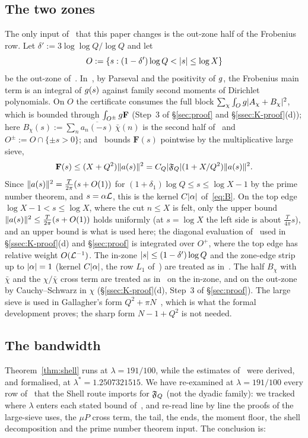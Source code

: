 \subsection{The two zones}\label{ssec:zones}
The only input of~\cite{DSouza} that this paper changes is the out-zone half of the Frobenius row. Let
$\delta':=3\log\log Q/\log Q$ and let
\[
O:=\{s:(1-\delta')\log Q<\lvert s\rvert\le\log X\}
\]
be the out-zone of~\cite[Lemma~4.3]{DSouza}. In~\cite[Lemmas~4.1--4.3]{DSouza}, by Parseval and the positivity of $g$, the
Frobenius main term is an integral of $g(s)$ against family second moments of Dirichlet polynomials. On $O$ the certificate consumes the full block $\sum_\chi\int_Og\lvert A_\chi+B_\chi\rvert^2$, which is bounded through $\int_{O^\pm}g\mathbf F$
(Step~3 of \S\ref{sec:proof} and \S\ref{ssec:K-proof}(d)); here $B_\chi(s):=\sum_n\overline{a_n(-s)}\,\bar\chi(n)$ is the second half of~\cite[Lemma~4.3]{DSouza} and
$O^\pm:=O\cap\{\pm s>0\}$; and~\cite{DSouza} bounds $\mathbf F(s)$ pointwise by the
multiplicative large sieve,
\[
\mathbf F(s)\le(X+Q^2)\lVert a(s)\rVert^2=C_Q\lvert \mathfrak F_Q\rvert(1+X/Q^2)\lVert a(s)\rVert^2 .
\]
Since $\lVert a(s)\rVert^2=\frac T{2\pi}(s+O(1))$ for $(1+\delta_1)\log Q\le s\le\log X-1$ by the prime number theorem, and $s=\alpha\mathcal L$, this is
the kernel $C\lvert \alpha\rvert$ of~\eqref{eq:B}. On the top edge $\log X-1<s\le\log X$, where the cut $n\le X$ is felt, only the upper bound
$\lVert a(s)\rVert^2\le\frac T{2\pi}(s+O(1))$ holds uniformly (at $s=\log X$ the left side is about $\frac T{4\pi}s$), and an upper bound is what is used here; the diagonal evaluation of~\cite{DSouza} used in
\S\ref{ssec:K-proof}(d) and \S\ref{sec:proof} is integrated over $O^+$, where the top edge has relative weight $O(\mathcal L^{-1})$. The in-zone $\lvert s\rvert\le(1-\delta')\log Q$ and the zone-edge strip up to $\lvert \alpha\rvert=1$ (kernel
$C\lvert \alpha\rvert$, the row $L_1$ of~\cite[\S10.3]{DSouza}) are treated as in~\cite[\S4]{DSouza}. The half $B_\chi$ with $\bar\chi$ and
the $\chi/\bar\chi$ cross term are treated as in~\cite[\S4]{DSouza} on the in-zone, and on the out-zone by Cauchy--Schwarz in
$\chi$ (\S\ref{ssec:K-proof}(d), Step~3 of \S\ref{sec:proof}). The large sieve is used in Gallagher's form $Q^2+\pi N$~\cite{Gal67}, which is what the formal
development proves; the sharp form $N-1+Q^2$ is not needed.

\subsection{The bandwidth}\label{ssec:bandwidth}
Theorem~\ref{thm:shell} runs at $\lambda=191/100$, while the estimates of~\cite{DSouza} were
derived, and formalised, at $\lambda^*=1.2507321515$. We have re-examined at $\lambda=191/100$ every row of~\cite{DSouza} that the Shell route imports for $\mathfrak F_Q$ (not the dyadic
family): we tracked where $\lambda$ enters each stated bound of~\cite[\S\S4--10]{DSouza}, and re-read line by line the proofs of the large-sieve
uses, the $\mu P$ cross term, the tail, the ends, the moment floor, the shell decomposition and the prime number theorem input. The conclusion is:

